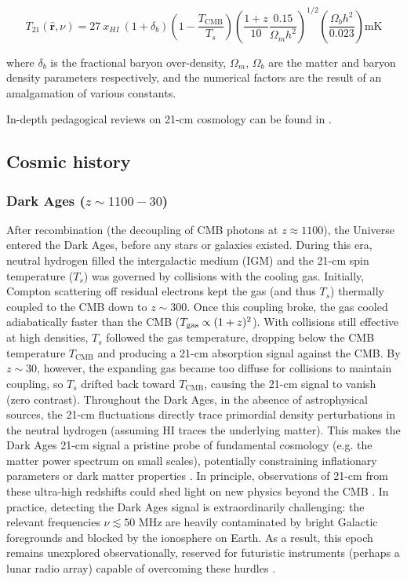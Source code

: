 \documentclass[floats,floatfix,showpacs,amssymb,prd,superscriptaddress,nofootinbib, 11pt]{revtex4-2} %
\begin{document}
\begin{equation}
    T_{21} (\hat{\textbf{r}}, \nu) = 27 \ x_{HI} \ (1 + \delta_b) \left(1 - \frac{T_{\text{CMB}}}{T_s} \right) \left(\frac{1 + z}{10} \frac{0.15}{\Omega_m h^2} \right)^{1/2} \left( \frac{\Omega_b h^2}{0.023} \right) \text{mK}
    \label{eq:brightness_temperature_approx}
\end{equation}

\noindent where $\delta_b$ is the fractional baryon over-density, $\Omega_m$, $\Omega_b$ are the matter and baryon density parameters respectively, and the numerical factors are the result of an amalgamation of various constants. 

In-depth pedagogical reviews on 21-cm cosmology can be found in \citet{Barkana_Loeb_2001, Furlanetto_2006, Pritchard_Loeb_2012, Barkana_2016, Mesinger_2019, Liu_Shaw_2020}.

\subsection{Cosmic history}
\subsubsection{Dark Ages ($z \sim 1100-30$)}
After recombination (the decoupling of CMB photons at $z \approx 1100$), the Universe entered the Dark Ages, before any stars or galaxies existed. During this era, neutral hydrogen filled the intergalactic medium (IGM) and the 21-cm spin temperature ($T_s$) was governed by collisions with the cooling gas. Initially, Compton scattering off residual electrons kept the gas (and thus $T_s$) thermally coupled to the CMB down to $z\sim300$. Once this coupling broke, the gas cooled adiabatically faster than the CMB (${T_{\rm gas}}\propto(1+z)^2$). With collisions still effective at high densities, $T_s$ followed the gas temperature, dropping below the CMB temperature $T_{\text{CMB}}$ and producing a 21-cm absorption signal against the CMB. By $z\sim30$, however, the expanding gas became too diffuse for collisions to maintain coupling, so $T_s$ drifted back toward $T_{\text{CMB}}$, causing the 21-cm signal to vanish (zero contrast). Throughout the Dark Ages, in the absence of astrophysical sources, the 21-cm fluctuations directly trace primordial density perturbations in the neutral hydrogen (assuming HI traces the underlying matter). This makes the Dark Ages 21-cm signal a pristine probe of fundamental cosmology (e.g. the matter power spectrum on small scales), potentially constraining inflationary parameters or dark matter properties \citep{Loeb_Zaldarriaga_2004}.
In principle, observations of 21-cm from these ultra-high redshifts could shed light on new physics beyond the CMB \citep{Scott_Rees_1990}.
In practice, detecting the Dark Ages signal is extraordinarily challenging: the relevant frequencies $\nu \lesssim 50$ MHz are heavily contaminated by bright Galactic foregrounds and blocked by the ionosphere on Earth. As a result, this epoch remains unexplored observationally, reserved for futuristic instruments (perhaps a lunar radio array) capable of overcoming these hurdles \citep{Tegmark_Zaldarriaga_2009}.
\end{document}
